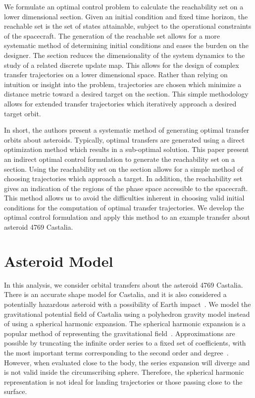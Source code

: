 We formulate an optimal control problem to calculate the reachability set on a lower dimensional \Poincare section.
Given an initial condition and fixed time horizon, the reachable set is the set of states attainable, subject to the operational constraints of the spacecraft.
The generation of the reachable set allows for a more systematic method of determining initial conditions and eases the burden on the designer.
The \Poincare section reduces the dimensionality of the system dynamics to the study of a related discrete update map.
This allows for the design of complex transfer trajectories on a lower dimensional space.
Rather than relying on intuition or insight into the problem, trajectories are chosen which minimize a distance metric toward a desired target on the \Poincare section.
This simple methodology allows for extended transfer trajectories which iteratively approach a desired target orbit.

In short, the authors present a systematic method of generating optimal transfer orbits about asteroids.
Typically, optimal transfers are generated using a direct optimization method which results in a sub-optimal solution.
This paper present an indirect optimal control formulation to generate the reachability set on a \Poincare section.
Using the reachability set on the \Poincare section allows for a simple method of choosing trajectories which approach a target.
In addition, the reachability set gives an indication of the regions of the phase space accessible to the spacecraft.
This method allows us to avoid the difficulties inherent in choosing valid initial conditions for the computation of optimal transfer trajectories.
We develop the optimal control formulation and apply this method to an example transfer about asteroid 4769 Castalia.

\section{Asteroid Model}\label{sec:asteroid_model}

In this analysis, we consider orbital transfers about the asteroid 4769 Castalia.
There is an accurate shape model for Castalia, and it is also considered a potentially hazardous asteroid with a possibility of Earth impact~\cite{hudson1994}.
We model the gravitational potential field of Castalia using a polyhedron gravity model instead of using a spherical harmonic expansion.
The spherical harmonic expansion is a popular method of representing the gravitational field~\cite{scheeres1996}.
Approximations are possible by truncating the infinite order series to a fixed set of coefficients, with the most important terms corresponding to the second order and degree~\cite{scheeres1994}. 
However, when evaluated close to the body, the series expansion will diverge and is not valid inside the circumscribing sphere.
Therefore, the spherical harmonic representation is not ideal for landing trajectories or those passing close to the surface.

